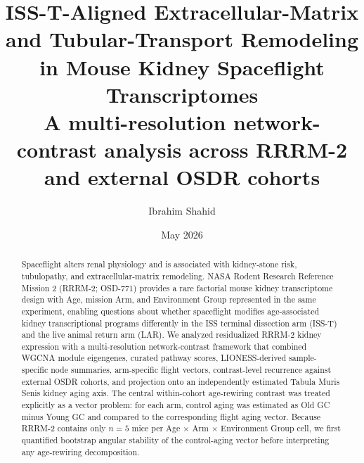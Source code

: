 \documentclass[11pt]{article}
\title{\textbf{ISS-T-Aligned Extracellular-Matrix and Tubular-Transport Remodeling in Mouse Kidney Spaceflight Transcriptomes}\\[0.35em]
\large A multi-resolution network-contrast analysis across RRRM-2 and external OSDR cohorts}
\author[1]{Ibrahim Shahid}
\author[1,*]{}
\affil[1]{Independent research, manuscript in preparation}
\affil[*]{Senior author placeholder pending PI involvement}
\date{May 2026}
\begin{document}
\maketitle

\begin{abstract}
\noindent
Spaceflight alters renal physiology and is associated with kidney-stone risk, tubulopathy, and extracellular-matrix remodeling. NASA Rodent Research Reference Mission 2 (RRRM-2; OSD-771) provides a rare factorial mouse kidney transcriptome design with Age, mission Arm, and Environment Group represented in the same experiment, enabling questions about whether spaceflight modifies age-associated kidney transcriptional programs differently in the ISS terminal dissection arm (ISS-T) and the live animal return arm (LAR). We analyzed residualized RRRM-2 kidney expression with a multi-resolution network-contrast framework that combined WGCNA module eigengenes, curated pathway scores, LIONESS-derived sample-specific node summaries, arm-specific flight vectors, contrast-level recurrence against external OSDR cohorts, and projection onto an independently estimated Tabula Muris Senis kidney aging axis. The central within-cohort age-rewiring contrast was treated explicitly as a vector problem: for each arm, control aging was estimated as Old GC minus Young GC and compared to the corresponding flight aging vector. Because RRRM-2 contains only $n=5$ mice per Age $\times$ Arm $\times$ Environment Group cell, we first quantified bootstrap angular stability of the control-aging vector before interpreting any age-rewiring decomposition.


\end{abstract}
\end{document}
